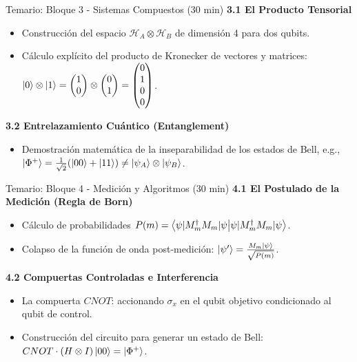 \documentclass[aspectratio=169]{beamer}
\begin{document}
\begin{frame}{Temario: Bloque 3 - Sistemas Compuestos (30 min)}
\textbf{3.1 El Producto Tensorial}
\begin{itemize}
    \item Construcción del espacio $\mathcal{H}_A \otimes \mathcal{H}_B$ de dimensión 4 para dos qubits.
    \item Cálculo explícito del producto de Kronecker de vectores y matrices: $\ket{0} \otimes \ket{1} = \begin{pmatrix} 1 \\ 0 \end{pmatrix} \otimes \begin{pmatrix} 0 \\ 1 \end{pmatrix} = \begin{pmatrix} 0 \\ 1 \\ 0 \\ 0 \end{pmatrix}$.
\end{itemize}
\textbf{3.2 Entrelazamiento Cuántico (Entanglement)}
\begin{itemize}
    \item Demostración matemática de la inseparabilidad de los estados de Bell, e.g., $\ket{\Phi^+} = \frac{1}{\sqrt{2}}(\ket{00} + \ket{11}) \neq \ket{\psi_A} \otimes \ket{\psi_B}$.
\end{itemize}
\end{frame}

\begin{frame}{Temario: Bloque 4 - Medición y Algoritmos (30 min)}
\textbf{4.1 El Postulado de la Medición (Regla de Born)}
\begin{itemize}
    \item Cálculo de probabilidades $P(m) = \braket{\psi | M_m^\dagger M_m | \psi}$.
    \item Colapso de la función de onda post-medición: $\ket{\psi'} = \frac{M_m\ket{\psi}}{\sqrt{P(m)}}$.
\end{itemize}
\textbf{4.2 Compuertas Controladas e Interferencia}
\begin{itemize}
    \item La compuerta $CNOT$: accionando $\sigma_x$ en el qubit objetivo condicionado al qubit de control.
    \item Construcción del circuito para generar un estado de Bell: $CNOT \cdot (H \otimes I) \ket{00} = \ket{\Phi^+}$.
\end{itemize}
\end{frame}
\end{document}
